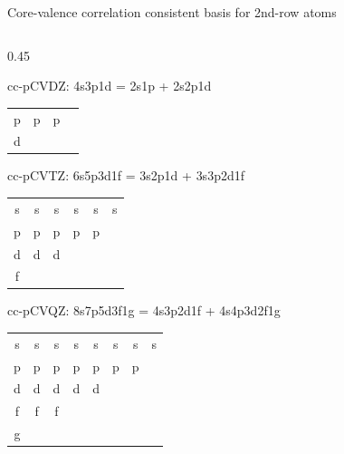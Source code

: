 \documentclass[aspectratio=169,9pt]{beamer}
\newcommand{\red}[1]{\textcolor{hfRed}{#1}}
\newcommand{\green}[1]{\textcolor{hfGreen}{#1}}
\begin{document}
\begin{frame}{Core-valence correlation consistent basis for 2nd-row atoms}
\begin{columns}
\begin{column}{0.45\textwidth}
\begin{block}{cc-p\red{C}\green{V}DZ: \small 4s3p1d = \red{2s1p} + \green{2s2p1d}}
\begin{tabular}{cccc}
        			\red{p} & \green{p} & \green{p} \\
        			\green{d} \\
        		\end{tabular}
        	\end{block}
        	\begin{block}{cc-p\red{C}\green{V}TZ: \small 6s5p3d1f = \red{3s2p1d} + \green{3s3p2d1f}}
        		\begin{tabular}{cccccc}
        			\red{s} & \red{s} & \red{s} & \green{s} & \green{s} & \green{s} \\
        			\red{p} & \red{p} & \green{p} & \green{p} & \green{p} \\
        			\red{d} & \green{d} & \green{d} \\
        			\green{f} \\
        		\end{tabular}
        	\end{block}
        	\begin{block}{cc-p\red{C}\green{V}QZ: \small 8s7p5d3f1g = \red{4s3p2d1f} + \green{4s4p3d2f1g}}
        		\begin{tabular}{cccccccc}
        			\red{s} & \red{s} & \red{s} & \red{s} & \green{s} & \green{s} & \green{s} & \green{s} \\
        			\red{p} & \red{p} & \red{p} & \green{p} & \green{p} & \green{p} & \green{p} \\
        			\red{d} & \red{d} & \green{d} & \green{d} & \green{d} \\
        			\red{f} & \green{f} & \green{f} \\
        			\green{g} \\
        		\end{tabular}
        	\end{block}
		\end{column}
	\end{columns}
\end{frame}
\end{document}
